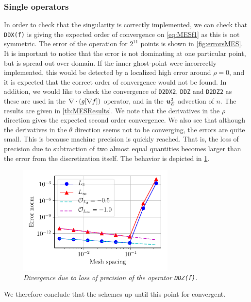 \subsubsection{Single operators}
\label{sec:singleOp}
%
In order to check that the singularity is correctly implemented, we can check that \texttt{DDX(f)} is giving the expected order of convergence on \cref{eq:MESf1} as this is not symmetric.
The error of the operation for $2^{11}$ points is shown in \cref{fig:errorsMES}.
It is important to notice that the error is not dominating at one particular point, but is spread out over domain.
If the inner ghost-point were incorrectly implemented, this would be detected by a localized high error around $\rho=0$, and it is expected that the correct order of convergence would not be found.
In addition, we would like to check the convergence of \texttt{D2DX2}, \texttt{DDZ} and \texttt{D2DZ2} as these are used in the $\nabla\cdot\left(g[\nabla f]\right)$ operator, and in the $\boldsymbol{u}_E^2$ advection of $n$.
The results are given in \cref{tb:MESResults}.
We note that the derivatives in the $\rho$ direction gives the expected second order convergence.
We also see that although the derivatives in the $\theta$ direction seems not to be converging, the errors are quite small.
This is because machine precision is quickly reached.
That is, the loss of precision due to subtraction of two almost equal quantities becomes larger than the error from the discretization itself.
The behavior is depicted in \cref{fig:divDDZ}.
%
\begin{figure}[htb]
    \centering
    \includegraphics[width=0.7\textwidth]{fig/divDDZ}
    \caption{\textit{
            Divergence due to loss of precision of the operator \texttt{DDZ(f)}.
        }}
    \label{fig:divDDZ}
\end{figure}
%
We therefore conclude that the schemes up until this point for convergent.

